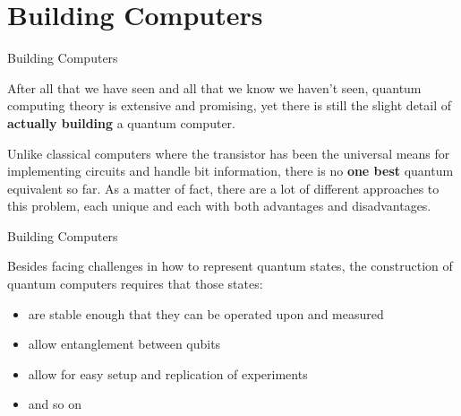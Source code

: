 \documentclass[aspectratio=43]{beamer}
\begin{document}
\section{Building \q Computers}
\begin{frame}{Building \q Computers}
    \begin{card}
        After all that we have seen and all that we know we haven't seen, quantum computing theory is extensive and promising, yet there is still the slight detail of \textbf{actually building} a quantum computer.
    \end{card}
    \begin{card}
        Unlike classical computers where the transistor has been the universal means for implementing circuits and handle bit information, there is no \textbf{one best} quantum equivalent so far. As a matter of fact, there are a lot of different approaches to this problem, each unique and each with both advantages and disadvantages.
    \end{card}
\pagenumber
\end{frame}

\begin{frame}{Building \q Computers}
    \begin{card}
        Besides facing challenges in how to represent quantum states, the construction of quantum computers requires that those states:
        \begin{itemize}
            \item are stable enough that they can be operated upon and measured
            \item allow entanglement between qubits
            \item allow for easy setup and replication of experiments
            \item and so on
        \end{itemize}
    \end{card}
\pagenumber
\end{frame}
\end{document}
